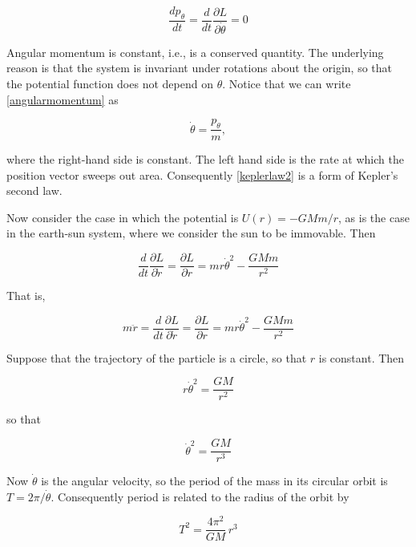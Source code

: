 \begin{equation}
\label{angularmomentum}
\frac{dp_\theta}{dt} = \frac{d}{dt}\frac{\partial L}{\partial \dot \theta} = 0
\end{equation}

Angular momentum is constant, i.e., is a conserved quantity.  The underlying reason is that the system is invariant under rotations about the origin, so that the potential function does not depend on $\theta$.  Notice that we can write \eqref{angularmomentum} as

\begin{equation}
\label{keplerlaw2}
\dot\theta = \frac{p_\theta}{m},
\end{equation}

where the right-hand side is constant.  The left hand side is the rate at which the position vector sweeps out area.   Consequently \eqref{keplerlaw2} is a form of Kepler's second law.

Now consider the case in which the potential is $U(r) = - GMm/r$, as is the case in the earth-sun system, where we consider the sun to be immovable.  Then

\begin{equation}
\frac{d}{dt}\frac{\partial L}{\partial \dot r}
= \frac{\partial L}{\partial r} = mr\dot \theta^2 - \frac{GMm}{r^2}
\end{equation}

That is,

\begin{equation}
m\ddot r = \frac{d}{dt}\frac{\partial L}{\partial \dot r}
= \frac{\partial L}{\partial r} = mr\dot \theta^2 - \frac{GMm}{r^2}
\end{equation}

Suppose that the trajectory of the particle is a circle, so that $r$ is constant.  Then

\begin{equation}
r\dot \theta^2 = \frac{GM}{r^2}
\end{equation}

so that 

\begin{equation}
\dot \theta^2 = \frac{GM}{r^3}
\end{equation}

Now $\dot\theta$ is the angular velocity, so the period of the mass in its circular orbit is $T = 2\pi/\dot\theta$.  Consequently period is related to the radius of the orbit by 

\begin{equation}
T^2 = \frac{4\pi^2}{GM}\, r^3 
\end{equation}

